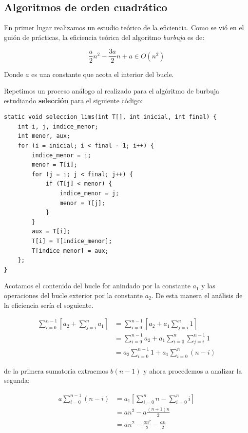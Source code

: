 \documentclass[11pt,a4paper]{article}
\begin{document}
\subsection{Algoritmos de orden cuadrático}

En primer lugar realizamos un estudio teórico de la eficiencia. Como se vió en el guión de prácticas, la eficiencia teórica del algoritmo \emph{burbuja} es de:

$$\frac{a}{2} n^2 - \frac{3a}{2} n + a \in O(n^2)$$

Donde $a$ es una constante que acota el interior del bucle.

Repetimos un proceso análogo al realizado para el algóritmo de burbuja estudiando \textbf{selección} para el siguiente código:

\begin{lstlisting}
static void seleccion_lims(int T[], int inicial, int final) {
	int i, j, indice_menor;
	int menor, aux;
	for (i = inicial; i < final - 1; i++) {
		indice_menor = i;
		menor = T[i];
		for (j = i; j < final; j++) {
			if (T[j] < menor) {
				indice_menor = j;
				menor = T[j];
			}
		}
		aux = T[i];
		T[i] = T[indice_menor];
		T[indice_menor] = aux;
	};
}
\end{lstlisting}

Acotamos el contenido del bucle for anindado por la constante $a_1$ y
las operaciones del bucle exterior por la constante $a_2$.  De esta
manera el análisis de la eficiencia sería el soguiente.

\begin{equation}
  \begin{aligned}
    \sum_{i=0}^{n-1}\left[a_2 + \sum_{j=i}^n{a_1}\right] &= \sum_{i=0}^{n-1}\left[a_2+a_1\sum_{j=i}^{n}1\right]  \\
    &= \sum_{i=0}^{n-1}a_2 + a_1 \sum_{i=0}^{n}\sum_{j=i}^{n-1}1 \\
    &= a_2\sum_{i=0}^{n-1}1 + a_1 \sum_{i=0}^{n}(n-i)
  \end{aligned}
\end{equation}

de la primera sumatoria extraemos $b(n-1)$ y ahora procedemos a analizar la segunda:

\begin{equation}
  \begin{aligned}
    a\sum_{i=0}^{n-1}(n-i) &= a_1\left[\sum_{i=0}^{n}n - \sum_{i=0}^{n}i\right]  \\
    &= an^2 - a \frac{(n+1)n}{2} \\
    &= an^2- \frac{an^2}{2} - \frac{an}{2}
  \end{aligned}
\end{equation}
\end{document}
